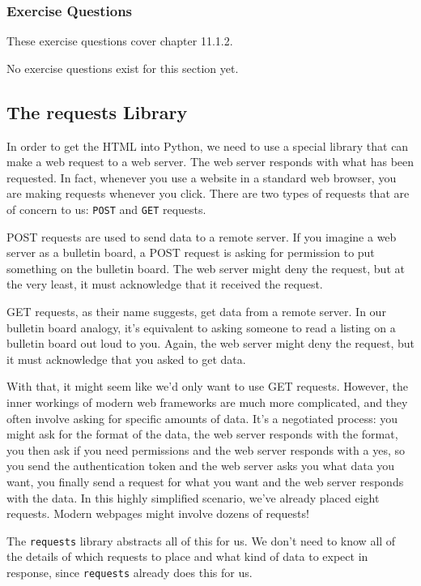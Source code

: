 \subsubsection*{Exercise Questions}
These exercise questions cover chapter 11.1.2.

No exercise questions exist for this section yet.

\subsection{The requests Library}
In order to get the HTML into Python, we need to use a special library that can make a web request to a web server. The web server responds with what has been requested. In fact, whenever you use a website in a standard web browser, you are making requests whenever you click. There are two types of requests that are of concern to us: \verb|POST| and \verb|GET| requests.\par
POST requests are used to send data to a remote server. If you imagine a web server as a bulletin board, a POST request is asking for permission to put something on the bulletin board. The web server might deny the request, but at the very least, it must acknowledge that it received the request.\par
GET requests, as their name suggests, get data from a remote server. In our bulletin board analogy, it's equivalent to asking someone to read a listing on a bulletin board out loud to you. Again, the web server might deny the request, but it must acknowledge that you asked to get data.\par
{}
With that, it might seem like we'd only want to use GET requests. However, the inner workings of modern web frameworks are much more complicated, and they often involve asking for specific amounts of data. It's a negotiated process: you might ask for the format of the data, the web server responds with the format, you then ask if you need permissions and the web server responds with a yes, so you send the authentication token and the web server asks you what data you want, you finally send a request for what you want and the web server responds with the data. In this highly simplified scenario, we've already placed eight requests. Modern webpages might involve dozens of requests!\par
The \verb|requests| library abstracts all of this for us. We don't need to know all of the details of which requests to place and what kind of data to expect in response, since \verb|requests| already does this for us.
